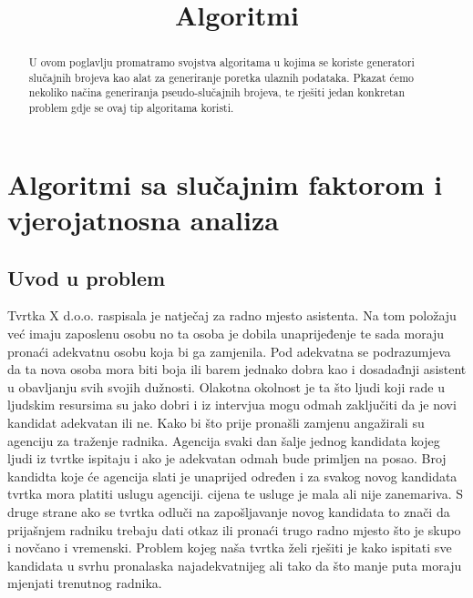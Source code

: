 \documentclass[10pt,a4paper]{article}
\title{Algoritmi}
\begin{document}
\maketitle
\newpage
\section{Algoritmi sa slučajnim faktorom i vjerojatnosna analiza} %
\label{sec:algoritmi_sa_slu_ajnim_faktorom_i_vjerojatnosna_analiza}

\begin{abstract}
U ovom poglavlju promatramo svojstva algoritama u kojima se koriste 
generatori slučajnih brojeva kao alat za generiranje poretka ulaznih podataka. 
Pkazat ćemo nekoliko načina generiranja pseudo-slučajnih brojeva, te rješiti jedan 
konkretan problem gdje se ovaj tip algoritama koristi.
\end{abstract}
\subsection{Uvod u problem}
Tvrtka X d.o.o. raspisala je natječaj za radno mjesto asistenta. Na tom položaju već imaju 
zaposlenu osobu no ta osoba je dobila unaprijeđenje te sada moraju pronaći adekvatnu osobu 
koja bi ga zamjenila. Pod adekvatna se podrazumjeva da ta nova osoba mora biti boja ili barem 
jednako dobra kao i dosadađnji asistent u obavljanju svih svojih dužnosti. Olakotna okolnost je 
ta što ljudi koji rade u ljudskim resursima  su jako dobri i iz intervjua mogu odmah zaključiti 
da je novi kandidat adekvatan ili ne.
Kako bi što prije pronašli zamjenu angažirali su agenciju za traženje radnika. 
Agencija svaki dan šalje jednog kandidata kojeg ljudi iz tvrtke ispitaju i ako je 
adekvatan odmah bude primljen na posao. Broj kandidta koje će agencija slati je unaprijed 
određen i za svakog novog kandidata tvrtka mora platiti uslugu agenciji. cijena te usluge je
mala ali nije zanemariva. S druge strane ako se tvrtka odluči na zapošljavanje novog kandidata 
to znači da prijašnjem radniku trebaju dati otkaz ili pronaći trugo radno mjesto što je skupo i novčano i vremenski.
Problem kojeg naša tvrtka želi rješiti je kako ispitati sve kandidata u svrhu pronalaska najadekvatnijeg 
ali tako da što manje puta moraju mjenjati trenutnog radnika.\\
\end{document}
